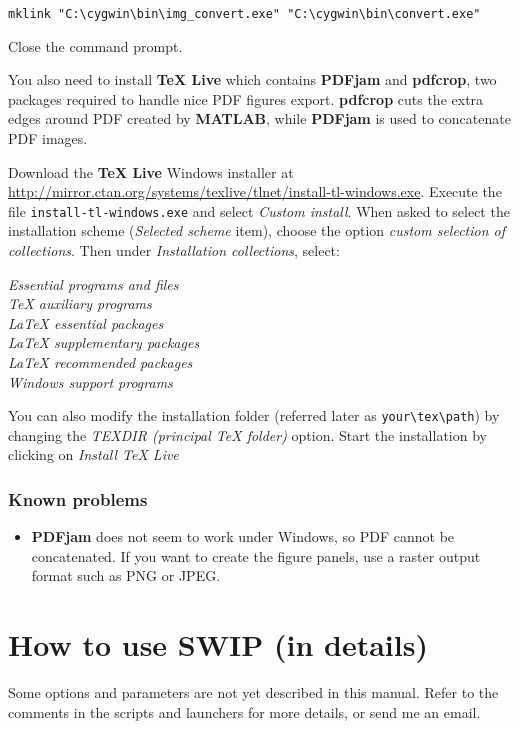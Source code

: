 \documentclass[twoside,a4paper]{article}
\def\SWIP{\textbf{SWIP}}
\def\PDFjam{\textbf{PDFjam}}
\def\pdfcrop{\textbf{pdfcrop}}
\def\MATLAB{\textbf{MATLAB}}
\begin{document}
\verb|mklink "C:\cygwin\bin\img_convert.exe" "C:\cygwin\bin\convert.exe"|

Close the command prompt.

You also need to install \textbf{TeX Live} which contains {\PDFjam} and {\pdfcrop}, two packages required to handle nice PDF figures export. {\pdfcrop} cuts the extra edges around PDF created by {\MATLAB}, while {\PDFjam} is used to concatenate PDF images.

Download the \textbf{TeX Live} Windows installer at \url{http://mirror.ctan.org/systems/texlive/tlnet/install-tl-windows.exe}. Execute the file \verb|install-tl-windows.exe| and select \textit{Custom install}. When asked to select the installation scheme (\textit{Selected scheme} item), choose the option \textit{custom selection of collections}. Then under \textit{Installation collections}, select:

\textit{Essential programs and files}\\
\textit{TeX auxiliary programs}\\
\textit{LaTeX essential packages}\\
\textit{LaTeX supplementary packages}\\
\textit{LaTeX recommended packages}\\
\textit{Windows support programs}

You can also modify the installation folder (referred later as \verb|your\tex\path|) by changing the \textit{TEXDIR (principal TeX folder)} option. Start the installation by clicking on \textit{Install TeX Live}

\subsubsection{Known problems}
\begin{itemize}
\setlength\itemsep{2ex}
\setlength{\parindent}{5ex}
\item {\PDFjam} does not seem to work under Windows, so PDF cannot be concatenated. If you want to create the figure panels, use a raster output format such as PNG or JPEG.

\end{itemize}

\clearpage
\section{How to use {\SWIP} (in details)}
Some options and parameters are not yet described in this manual. Refer to the comments in the scripts and launchers for more details, or send me an email.
\end{document}
